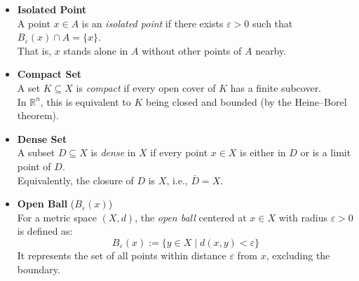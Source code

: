 \begin{itemize}
    \item \textbf{Isolated Point} \\
    A point \( x \in A \) is an \emph{isolated point} if there exists \( \varepsilon > 0 \) such that \( B_\varepsilon(x) \cap A = \{x\} \). \\
    That is, \( x \) stands alone in \( A \) without other points of \( A \) nearby.

    \item \textbf{Compact Set} \\
    A set \( K \subseteq X \) is \emph{compact} if every open cover of \( K \) has a finite subcover. \\
    In \(\mathbb{R}^n\), this is equivalent to \( K \) being closed and bounded (by the Heine–Borel theorem).

    \item \textbf{Dense Set} \\
    A subset \( D \subseteq X \) is \emph{dense} in \( X \) if every point \( x \in X \) is either in \( D \) or is a limit point of \( D \). \\
    Equivalently, the closure of \( D \) is \( X \), i.e., \( \overline{D} = X \).

    \item \textbf{Open Ball} (\( B_\varepsilon(x) \)) \\
    For a metric space \( (X, d) \), the \emph{open ball} centered at \( x \in X \) with radius \( \varepsilon > 0 \) is defined as: \\
    \[
    B_\varepsilon(x) := \{ y \in X \mid d(x, y) < \varepsilon \}
    \]
    It represents the set of all points within distance \( \varepsilon \) from \( x \), excluding the boundary.
\end{itemize}

\newpage